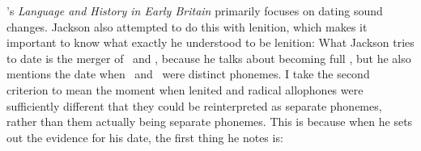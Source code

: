 \Textcite{jackson_language_1953}'s \emph{Language and History in Early Britain} primarily focuses on dating sound changes. Jackson also attempted to do this with lenition, which makes it important to know what exactly he understood to be lenition:
What Jackson tries to date is the merger of \lT\ and \xD, because he talks about  becoming full , but he also mentions the date when \lT\ and \xD\ were distinct phonemes. I take the second criterion to mean the moment when lenited and radical allophones were sufficiently different that they could be reinterpreted as separate phonemes, rather than them actually being separate phonemes. This is because when he sets out the evidence for his date, the first thing he notes is:
